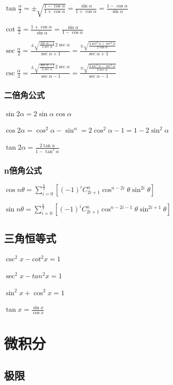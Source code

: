 \documentclass[UTF8]{ctexbook}
\newcommand{\mathCombination}[2]{C_{#1}^{#2}}
\begin{document}
{{{{  $\tan\frac{\alpha}{2} = \pm\sqrt{\frac{1-\cos\alpha}{1+\cos\alpha}} = \frac{\sin\alpha}{1+\cos\alpha} = \frac{1-\cos\alpha}{\sin\alpha}$

  $\cot\frac{\alpha}{2} = \frac{1+\cos\alpha}{\sin\alpha} = \frac{\sin\alpha}{1-\cos\alpha}$

  $\sec\frac{\alpha}{2} = \frac{\pm\sqrt{\frac{\sec\alpha - 1}{2\sec\alpha}}2\sec\alpha}{\sec\alpha + 1} = \frac{\pm\sqrt{\frac{4\sec^3\alpha + \sec^2\alpha}{2\cos\alpha}}}{\sec\alpha + 1}$

  $\csc\frac{\alpha}{2} = \frac{\pm\sqrt{\frac{\sec\alpha - 1}{2\sec\alpha}}2\sec\alpha}{\sec\alpha - 1} = \frac{\pm\sqrt{\frac{3\sec^3\alpha - \sec^2\alpha}{2\sec\alpha}}}{\sec\alpha - 1}$
}

\subsubsection{二倍角公式}{
  $\sin2\alpha = 2\sin\alpha\cos\alpha$

  $\cos2\alpha = \cos^2\alpha - \sin^\alpha = 2\cos^2\alpha - 1 = 1 - 2\sin^2\alpha$

  $\tan2\alpha = \frac{2\tan\alpha}{1 - \tan^2\alpha}$
}

\subsubsection{n倍角公式}{
$\cos{n\theta} = \sum_{i = 0}^{\frac{n}{2}}[(-1)^i\mathCombination{2i + 1}{n}\cos^{n - 2i}\theta\sin^{2i}\theta]$

$\sin{n\theta} = \sum_{i = 0}^{\frac{n}{2}}[(-1)^i\mathCombination{2i + 1}{n}\cos^{n - 2i - 1}\theta\sin^{2i+1}\theta]$
}

\subsection{三角恒等式}{
$\csc^2{x} - cot^2{x} = 1$

$\sec^2x - tan^2x = 1$ %

$\sin^2x + \cos^2x = 1$

$\tan{x} = \frac{\sin{x}}{\cos{x}}$
}

}

\section{微积分}{

  \subsection{极限}{

}}}}
\end{document}
